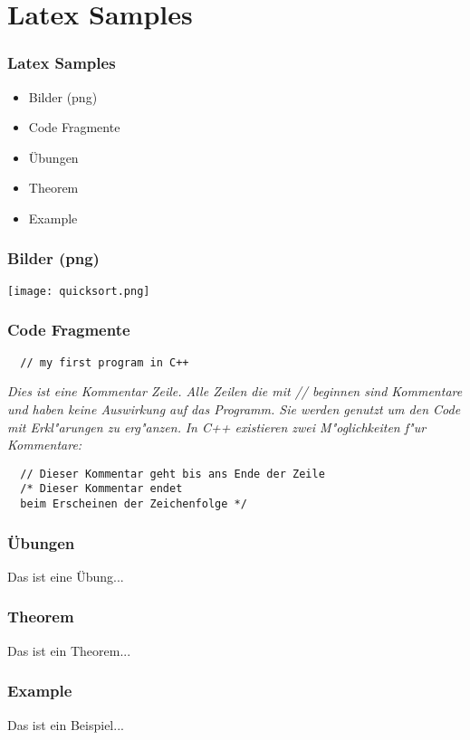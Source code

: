 \section{Latex Samples}
\begin{frame}[fragile]
  \frametitle{Latex Samples}
  \begin{itemize}
  \item Bilder (png)
  \item Code Fragmente
  \item Übungen
  \item Theorem
  \item Example
  \end{itemize}
\end{frame}

\begin{frame}[fragile]
  \frametitle{Bilder (png)}
  \centering\texttt{[image: quicksort.png]}
\end{frame}

\begin{frame}[fragile]
  \frametitle{Code Fragmente}
  \begin{lstlisting}
  // my first program in C++
  \end{lstlisting}
  \emph{Dies ist eine Kommentar Zeile. Alle Zeilen die mit // beginnen sind
  Kommentare und haben keine Auswirkung auf das Programm. Sie werden
  genutzt um den Code mit Erkl"arungen zu erg"anzen.}
  \vspace{3mm}
  \emph{In C++ existieren zwei M"oglichkeiten f"ur Kommentare:}
  \begin{lstlisting}
  // Dieser Kommentar geht bis ans Ende der Zeile
  /* Dieser Kommentar endet
  beim Erscheinen der Zeichenfolge */
  \end{lstlisting}
\end{frame}

\begin{frame}[fragile]
  \frametitle{Übungen}
  \begin{exercise}
  Das ist eine Übung...
  \end{exercise}
\end{frame}

\begin{frame}[fragile]
  \frametitle{Theorem}
  \begin{theorem}
  Das ist ein Theorem...
  \end{theorem}
\end{frame}

\begin{frame}[fragile]
  \frametitle{Example}
  \begin{example}
  Das ist ein Beispiel...
  \end{example}
\end{frame}
